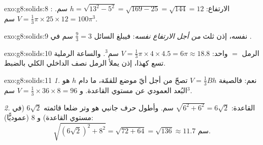 \begin{solution}{exo:g8:solids:8}
الارتفاع: $h = \sqrt{13^2 - 5^2} = \sqrt{169 - 25} = \sqrt{144} = 12$
سم. : $V = \frac13 \pi \times 25 \times 12 = 100\pi$ سم$^3$.
\end{solution}

\begin{solution}{exo:g8:solids:9}
 نفسه، إذن   ثلث 
 \emph{من أجل الارتفاع نفسه}: فيبلغ السائل
$\frac{9}{3} = 3$ سم في .
\end{solution}

\begin{solution}{exo:g8:solids:10}
الرمل $=$  واحد: $V = \frac13 \pi \times 4 \times 4.5 = 6\pi
\approx 18.8$ سم$^3$. والساعة الرملية تسع  كهذا، إذن
يملأ الرمل نصف  الداخلي الكلي بالضبط.
\end{solution}

\begin{solution}{exo:g8:solids:11}
\emph{1.} نعم: فالصيغة $V = \frac13 Bh$ تصحّ من أجل أيّ موضع
للقمّة، ما دام $h$ هو البُعد العمودي عن مستوي
القاعدة. و $V = \frac13 \times 36 \times 8 = 96$ سم$^3$.

\emph{2.}  القاعدة: $\sqrt{6^2 + 6^2} = 6\sqrt2$ سم. وأطول
حرف جانبي هو وتر  ضلعا قائمته
$6\sqrt2$ (في مستوي القاعدة) و $8$ (عموديًّا):
\[
\sqrt{(6\sqrt2)^2 + 8^2} = \sqrt{72 + 64} = \sqrt{136} \approx 11.7
\text{ سم}.
\]
\end{solution}

